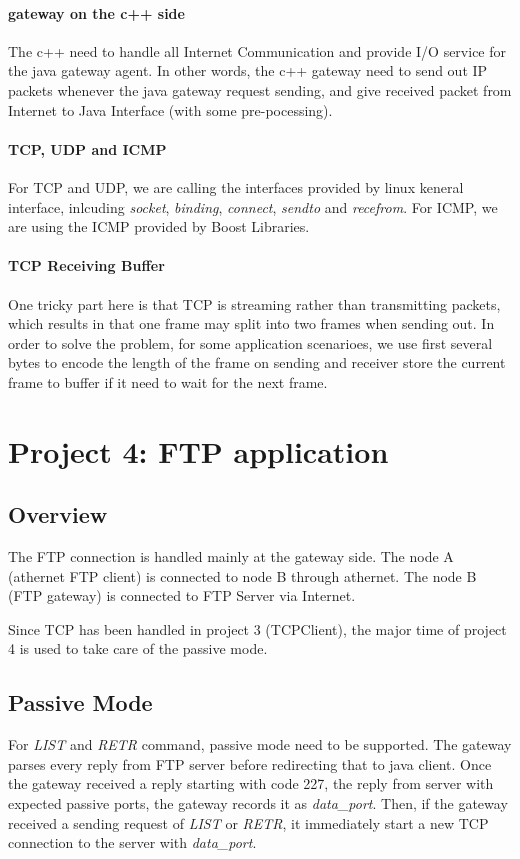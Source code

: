 \documentclass[conference,compsoc]{IEEEtran}
\begin{document}
		\paragraph{\textbf{gateway on the c++ side}}
		The c++ need to handle all Internet Communication and provide I/O service for the java gateway agent. In other words, the c++ gateway need to send out IP packets whenever the java gateway request sending, and give received packet from Internet to Java Interface (with some pre-pocessing).
		
		\paragraph{\textbf{TCP, UDP and ICMP}}
		For TCP and UDP, we are calling the interfaces provided by linux keneral interface, inlcuding \emph{socket}, \emph{binding}, \emph{connect}, \emph{sendto} and \emph{recefrom}. For ICMP, we are using the ICMP provided by Boost Libraries. 
		\paragraph{\textbf{TCP Receiving Buffer}}
		 One tricky part here is that TCP is streaming rather than transmitting packets, which results in that one frame may split into two frames when sending out. In order to solve the problem, for some application scenarioes, we use first several bytes to encode the length of the frame on sending and receiver store the current frame to buffer if it need to wait for the next frame.
		

\section{Project 4: FTP application}
	\subsection{Overview}	
	The FTP connection is handled mainly at the gateway side. The node A (athernet FTP client) is connected to node B through athernet. The node B (FTP gateway) is connected to FTP Server via Internet.
	\par
	Since TCP has been handled in project 3 (TCPClient), the major time of project 4 is used to take care of the passive mode.
	\subsection{Passive Mode}
	For \emph{LIST} and \emph{RETR} command, passive mode need to be supported. The gateway parses every reply from FTP server before redirecting that to java client. Once the gateway received a reply starting with code 227, the reply from server with expected passive ports, the gateway records it as \emph{data\_port}. Then, if the gateway received a sending request of \emph{LIST} or \emph{RETR}, it immediately start a new TCP connection to the server with \emph{data\_port}.
\end{document}
